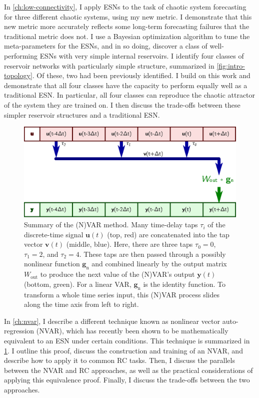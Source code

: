 In \cref{ch:low-connectivity}, I apply ESNs to the task of chaotic
system forecasting for three different chaotic systems, using my new
metric. I demonstrate that this new metric more accurately reflects
some long-term forecasting failures that the traditional metric does
not. I use a Bayesian optimization algorithm to tune the
meta-parameters for the ESNs, and in so doing, discover a class of
well-performing ESNs with very simple internal reservoirs. I identify
four classes of reservoir networks with particularly simple structure,
summarized in \cref{fig:intro-topology}. Of these, two had been
previously identified. I build on this work and demonstrate that all
four classes have the capacity to perform equally well as a traditional
ESN. In particular, all four classes can reproduce the chaotic
attractor of the system they are trained on. I then discuss the
trade-offs between these simpler reservoir structures and a
traditional ESN.

\begin{figure}
  \includegraphics{figures/var-infer}
  \caption{Summary of the (N)VAR method. Many time-delay taps $\tau_i$
    of the discrete-time signal $\bm{u}(t)$ (top, red) are concatenated into the tap
    vector $\bm{v}(t)$ (middle, blue). Here, there are three taps
    $\tau_0=0$, $\tau_1=2$, and $\tau_2=4$. These taps are then passed
    through a possibly nonlinear function $\bm{g}_\text{n}$ and
    combined linearly by the output matrix $W_\text{out}$ to produce
    the next value of the (N)VAR's output $\bm{y}(t)$ (bottom,
    green). For a linear VAR, $\bm{g}_\text{n}$ is the identity
    function. To transform a whole time series input, this (N)VAR process
    slides along the time axis from left to right.}
  \label{fig:intro-var-infer}
\end{figure}

In \cref{ch:nvar}, I describe a different technique known as nonlinear
vector auto-regression (NVAR), which has recently been shown to be
mathematically equivalent to an ESN under certain conditions.  This
technique is summarized in \cref{fig:intro-var-infer}.  I outline this
proof, discuss the construction and training of an NVAR, and describe
how to apply it to common RC tasks. Then, I discuss the parallels
between the NVAR and RC approaches, as well as the practical
considerations of applying this equivalence proof. Finally, I discuss
the trade-offs between the two approaches.

